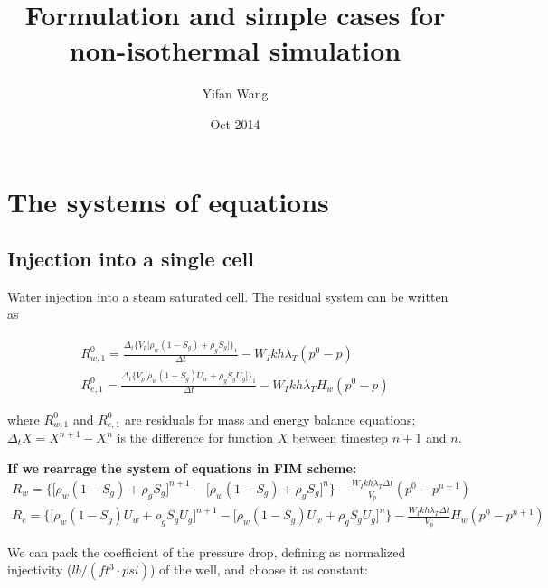 \documentclass[11pt]{article}
\title{Formulation and simple cases for non-isothermal simulation}
\author{Yifan Wang}
\date{Oct 2014}
\begin{document}
\maketitle

\section{The systems of equations}

\subsection{Injection into a single cell}

    Water injection into a steam saturated cell. The residual system
    can be written as
    
    \begin{gather}
        R^0_{w,1}=\frac{\Delta_t\Big\{V_p\big[
                                         \rho_w(1-S_g) + \rho_gS_g
                                       \big]
                              \Big\}_1}
                       {\Delta t} - W_Ikh\lambda_T(p^0-p) \\
        R^0_{e,1}=\frac{\Delta_t\Big\{V_p\big[
                                         \rho_w(1-S_g)U_w + \rho_gS_gU_g
                                       \big]
                              \Big\}_1}
                       {\Delta t} - W_Ikh\lambda_TH_w(p^0-p)
    \end{gather}
    
    where $R^0_{w,1}$ and $R^0_{e,1}$ are residuals for mass
    and energy balance equations; $\Delta_tX=X^{n+1}-X^n$ is
    the difference for function $X$ between timestep $n+1$ and
    $n$.
    
    \vspace {10pt}
    
    \noindent\textbf{If we rearrage the system of equations in FIM scheme:}
    \begin{gather}
        R_w=\Big\{\big[\rho_w(1-S_g) + \rho_gS_g\big]^{n+1} - 
                         \big[\rho_w(1-S_g) + \rho_gS_g\big]^{n}\Big\} -
                      \frac{W_Ikh\lambda_T\Delta t}{V_p}(p^0 - p^{n+1}) \\
        R_e=\Big\{\big[\rho_w(1-S_g)U_w + \rho_gS_gU_g\big]^{n+1} -
                        \big[\rho_w(1-S_g)U_w + \rho_gS_gU_g\big]^{n}\Big\} -
                      \frac{W_Ikh\lambda_T\Delta t}{V_p}H_w(p^0 - p^{n+1})
    \end{gather}
    
    We can pack the coefficient of the pressure drop, defining as normalized
    injectivity ($lb/(ft^3\cdot psi)$) of the well, and choose it as constant:
    
\end{document}
